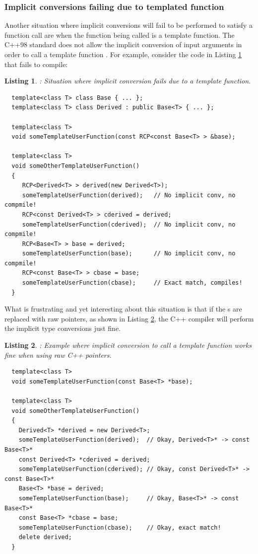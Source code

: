 \documentclass[pdf,ps2pdf,11pt]{SANDreport}
\newtheorem{listing}{Listing}
\begin{document}
%
{}\subsubsection*{Implicit conversions failing due to templated function}
%

Another situation where implicit conversions will fail to be performed
to satisfy a function call are when the function being called is a
template function.  The C++98 standard does not allow the implicit
conversion of input arguments in order to call a template function
{}\cite[Item 45]{EffectiveC++ThirdEdition}.  For example, consider the
code in Listing {}\ref{listing:implicit-conv-fail-template-func} that
fails to compile:


{}\begin{listing}: Situation where implicit conversion fails due to a
template function.
\label{listing:implicit-conv-fail-template-func}
{\small\begin{verbatim}
  template<class T> class Base { ... };
  template<class T> class Derived : public Base<T> { ... };

  template<class T>
  void someTemplateUserFunction(const RCP<const Base<T> > &base);

  template<class T>
  void someOtherTemplateUserFunction()
  {
     RCP<Derived<T> > derived(new Derived<T>);
     someTemplateUserFunction(derived);   // No implicit conv, no compmile!
     RCP<const Derived<T> > cderived = derived;
     someTemplateUserFunction(cderived);  // No implicit conv, no compmile!
     RCP<Base<T> > base = derived;
     someTemplateUserFunction(base);      // No implicit conv, no compmile!
     RCP<const Base<T> > cbase = base;
     someTemplateUserFunction(cbase);     // Exact match, compiles!
  }
\end{verbatim}}
\end{listing}


What is frustrating and yet interesting about this situation is that
if the {}s are replaced with raw pointers, as shown in
Listing {}\ref{listing:implicit-conv-pass-raw--template-func}, the C++
compiler will perform the implicit type conversions just fine.


{}\begin{listing}: Example where implicit conversion to call a
template function works fine when using raw C++ pointers.
\label{listing:implicit-conv-pass-raw--template-func}
{\small\begin{verbatim}
  template<class T>
  void someTemplateUserFunction(const Base<T> *base);
  
  template<class T>
  void someOtherTemplateUserFunction()
  {
    Derived<T> *derived = new Derived<T>;
    someTemplateUserFunction(derived);  // Okay, Derived<T>* -> const Base<T>*
    const Derived<T> *cderived = derived;
    someTemplateUserFunction(cderived); // Okay, const Derived<T>* -> const Base<T>*
    Base<T> *base = derived;
    someTemplateUserFunction(base);     // Okay, Base<T>* -> const Base<T>*
    const Base<T> *cbase = base;
    someTemplateUserFunction(cbase);    // Okay, exact match!
    delete derived;
  }
\end{verbatim}}
\end{listing}
\end{document}
